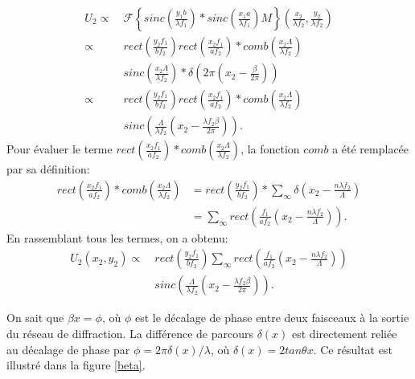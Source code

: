 \documentclass[conference]{IEEEtran}
\begin{document}
\begin{align*}
    U_2\propto&\ \mathscr{F}\left\{sinc(\frac{y_1b}{\lambda f_1})\ast sinc(\frac{x_1a}{\lambda f_1})M\right\}(\frac{x_2}{\lambda f_2},\frac{y_2}{\lambda f_2})\\
    \propto&\ rect(\frac{y_2 f_1}{b f_2})rect(\frac{x_2 f_1}{a f_2})\ast comb(\frac{x_2 \Lambda}{\lambda f_2})\\
    &\ sinc(\frac{x_2 \Lambda}{\lambda f_2})\ast \delta(2\pi(x_2-\frac{\beta}{2\pi}))\\
    \propto&\ rect(\frac{y_2 f_1}{b f_2})rect(\frac{x_2 f_1}{a f_2})\ast comb(\frac{x_2 \Lambda}{\lambda f_2})\\
    &\ sinc(\frac{\Lambda}{\lambda f_2}(x_2-\frac{\lambda f_2 \beta}{2\pi})).
\end{align*}
Pour évaluer le terme $rect(\frac{x_2 f_1}{a f_2})\ast comb(\frac{x_2 \Lambda}{\lambda f_2})$, la fonction $comb$ a été remplacée par sa définition:
\begin{align*}
    rect(\frac{x_2 f_1}{a f_2})\ast comb(\frac{x_2 \Lambda}{\lambda f_2})&=rect(\frac{y_2 f_1}{b f_2})\ast\sum_{\infty}\delta(x_2-\frac{n\lambda f_2}{\Lambda})\\
    &=\sum_{\infty}rect(\frac{f_1}{a f_2}(x_2-\frac{n\lambda f_2}{\Lambda})).
\end{align*}
En rassemblant tous les termes, on a obtenu:
\begin{align*}
    U_2(x_2,y_2)\propto&\ rect(\frac{y_2 f_1}{b f_2})\sum_{\infty}rect(\frac{f_1}{a f_2}(x_2-\frac{n\lambda f_2}{\Lambda}))\\
    & \ sinc(\frac{\Lambda}{\lambda f_2}(x_2-\frac{\lambda f_2 \beta}{2\pi})).
\end{align*}

On sait que $\beta x = \phi$, où $\phi$ est le décalage de phase entre deux faisceaux à la sortie du réseau de diffraction.
La différence de parcours $\delta(x)$ est directement reliée au décalage de phase par $\phi=2\pi\delta(x)/\lambda$, où $\delta(x)=2tan\theta x$.
Ce résultat est illustré dans la figure \ref{beta}. 
\end{document}
